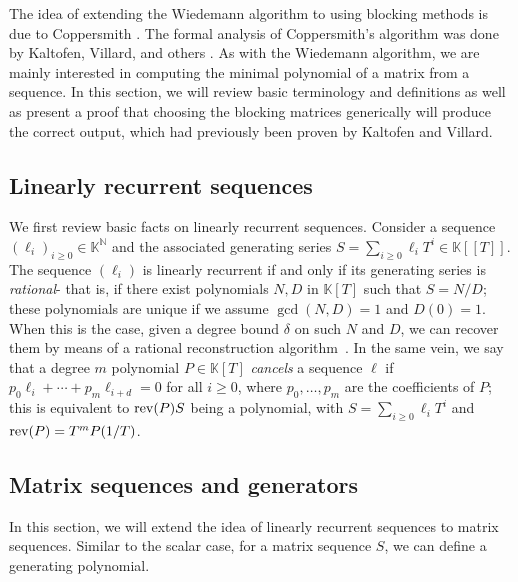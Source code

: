 \documentclass[12pt]{article}
\def\N {\ensuremath{\mathbb{N}}}
\def\K {\ensuremath{\mathbb{K}}}
\def\K{\mathbb{K}}
\begin{document}
The idea of extending the Wiedemann algorithm to using
blocking methods is due to Coppersmith \cite{Coppersmith93}.
The formal analysis of Coppersmith's algorithm was done by
Kaltofen, Villard, and others \cite{KaVi04}\cite{Villard97}.
As with the Wiedemann algorithm, we are mainly interested in
computing the minimal polynomial of a matrix from a sequence.
In this section, we will review basic terminology and definitions
as well as present a proof that choosing the blocking matrices 
generically will produce the correct output, 
which had previously been proven by Kaltofen and Villard.

\subsection{Linearly recurrent sequences}
We first review basic facts on linearly recurrent sequences.
Consider a sequence $(\ell_i)_{i \ge 0} \in \K^\N$
and the associated generating series $S=\sum_{i \ge 0} \ell_i T^i \in
\K[[T]]$. The sequence $(\ell_i)$ is {\rm linearly recurrent} if and
only if its generating series is {\em rational}- that is, if there
exist polynomials $N,D$ in $\K[T]$ such that $S=N/D$; these
polynomials are unique if we assume $\gcd(N,D)=1$ and $D(0)=1$. When
this is the case, given a degree bound $\delta$ on such $N$ and $D$,
we can recover them by means of a rational reconstruction
algorithm~\cite{GaGe13}. In the same vein, we say that a degree $m$
polynomial $P\in\K[T]$ {\em cancels} a sequence $\ell$ if $p_0 \ell_i
+ \cdots + p_m \ell_{i+d}=0$ for all $i \ge 0$, where $p_0,\dots,p_m$
are the coefficients of $P$; this is equivalent to ${\rm rev}(P) S$
being a polynomial, with $S=\sum_{i \ge 0} \ell_i T^i$ and ${\rm
	rev}(P)=T^m P(1/T)$.

\subsection{Matrix sequences and generators}
In this section, we will extend the idea of linearly recurrent
sequences to matrix sequences.
Similar to the scalar case, for a matrix sequence $S$,
we can define a generating polynomial.
\end{document}
